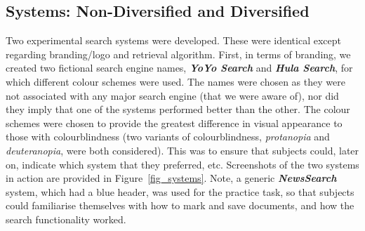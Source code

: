 \subsection{Systems: Non-Diversified and Diversified}\label{sec:method:systems}
Two experimental search systems were developed. These were identical except regarding branding/logo and retrieval algorithm. First, in terms of branding, we created two fictional search engine names,
\textbf{\emph{YoYo Search}} and \textbf{\emph{Hula Search}}, for which different colour schemes were used. The names were chosen as they were not associated with any major search engine (that we were aware of), nor did they imply that one of the systems performed better than the other. The colour schemes were chosen to provide the greatest difference in visual appearance to those with colourblindness (two variants of colourblindness, \emph{protanopia} and \emph{deuteranopia}, were both considered). This was to ensure that subjects could, later on, indicate which system that they preferred, etc. Screenshots of the two systems in action are provided in Figure~\ref{fig_systems}. 
Note, a generic \textbf{\emph{NewsSearch}} system, which had a blue header, was used for the practice task, so that subjects could familiarise themselves with how to mark and save documents, and how the search functionality worked.

    
    
    
